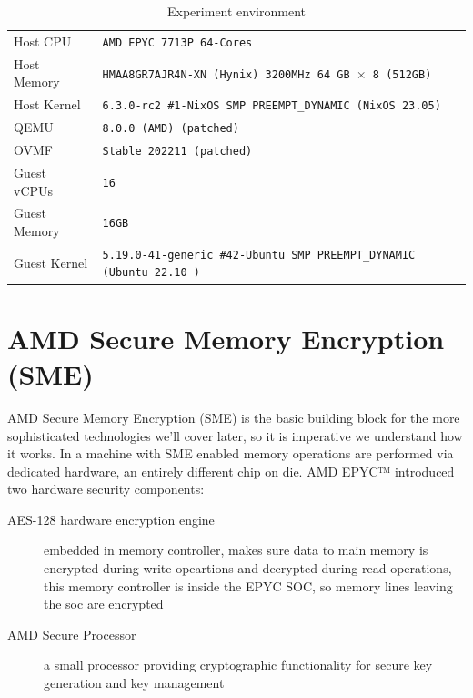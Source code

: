 \documentclass[twocolumn]{article}
\begin{document}
\begin{table}
    \centering
    \label{tab:experiment-environment}
    \begin{tabular}{l|l}
        \hline
        Host CPU      & \texttt{AMD EPYC 7713P 64-Cores}                                            \\
        Host Memory   & \texttt{HMAA8GR7AJR4N-XN (Hynix) 3200MHz 64 GB $\times$ 8 (512GB)}          \\
        Host Kernel   & \texttt{6.3.0-rc2 \#1-NixOS SMP PREEMPT\_DYNAMIC (NixOS 23.05)}             \\
        QEMU          & \texttt{8.0.0 (AMD) (patched)}                                              \\
        OVMF          & \texttt{Stable 202211 (patched)}                                            \\
        Guest vCPUs   & \texttt{16}                                                                 \\
        Guest Memory  & \texttt{16GB}                                                               \\
        Guest Kernel  & \texttt{5.19.0-41-generic \#42-Ubuntu SMP PREEMPT\_DYNAMIC (Ubuntu 22.10 )} \\ 
        \hline
    \end{tabular}
    \caption{Experiment environment}
\end{table}

\section{AMD Secure Memory Encryption (SME)}
AMD Secure Memory Encryption (SME) is the basic building block for the more sophisticated technologies we'll cover later, so it is imperative we understand how it works. In a machine with SME enabled memory operations are performed via dedicated hardware, an entirely different chip on die. AMD EPYC™ introduced two hardware security components:
\begin{description}
    \item [AES-128 hardware encryption engine] embedded in memory controller, makes sure data to main memory is encrypted during write opeartions and decrypted during read operations, this memory controller is inside the EPYC SOC, so memory lines leaving the soc are encrypted
    \item [AMD Secure Processor] a small processor providing cryptographic functionality for secure key generation and key management
\end{description}
\end{document}
